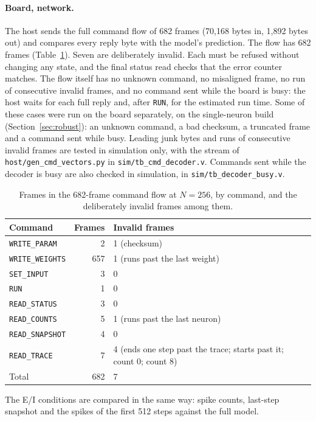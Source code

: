\documentclass[11pt]{article}
\begin{document}
\paragraph{Board, network.}
The host sends the full command flow of 682 frames (70,168 bytes in, 1,892 bytes out) and compares every reply byte with the model's prediction.
The flow has 682 frames (Table~\ref{tab:flow}). Seven are deliberately invalid. Each must be refused without changing any state, and the final status read checks that the error counter matches. The flow itself has no unknown command, no misaligned frame, no run of consecutive invalid frames, and no command sent while the board is busy: the host waits for each full reply and, after \texttt{RUN}, for the estimated run time. Some of these cases were run on the board separately, on the single-neuron build (Section~\ref{sec:robust}): an unknown command, a bad checksum, a truncated frame and a command sent while busy. Leading junk bytes and runs of consecutive invalid frames are tested in simulation only, with the stream of \texttt{host/gen\_cmd\_vectors.py} in \texttt{sim/tb\_cmd\_decoder.v}. Commands sent while the decoder is busy are also checked in simulation, in \texttt{sim/tb\_decoder\_busy.v}.
\begin{table}[t]
\centering
\caption{Frames in the 682-frame command flow at $N=256$, by command, and the deliberately invalid frames among them.}
\label{tab:flow}
\setlength{\tabcolsep}{7pt}
\begin{tabular}{lrl}
\toprule
Command & Frames & Invalid frames \\
\midrule
\texttt{WRITE\_PARAM} & 2 & 1 (checksum) \\
\texttt{WRITE\_WEIGHTS} & 657 & 1 (runs past the last weight) \\
\texttt{SET\_INPUT} & 3 & 0 \\
\texttt{RUN} & 1 & 0 \\
\texttt{READ\_STATUS} & 3 & 0 \\
\texttt{READ\_COUNTS} & 5 & 1 (runs past the last neuron) \\
\texttt{READ\_SNAPSHOT} & 4 & 0 \\
\texttt{READ\_TRACE} & 7 & 4 (ends one step past the trace; starts past it; count 0; count 8) \\
\midrule
Total & 682 & 7 \\
\bottomrule
\end{tabular}
\end{table}

The E/I conditions are compared in the same way: spike counts, last-step snapshot and the spikes of the first 512 steps against the full model.
\end{document}
